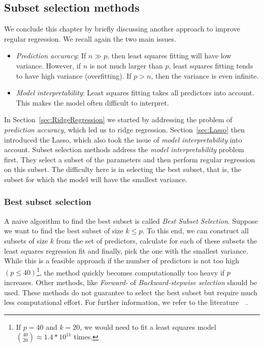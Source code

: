 \subsection{Subset selection methods}
We conclude this chapter by briefly discussing another approach to improve regular regression. We recall again the two main issues.
\begin{itemize}
    \item \textit{Prediction accuracy}: If $n \gg p$, then least squares fitting will have low variance. However, if $n$ is not much larger than $p$, least squares fitting tends to have high variance (overfitting). If $p > n$, then the variance is even infinite.
    \item \textit{Model interpretability}: Least squares fitting takes all predictors into account. This makes the model often difficult to interpret.
\end{itemize}
In Section~\ref{sec:RidgeRegression} we started by addressing the problem of \textit{prediction accuracy}, which led us to ridge regression. Section~\ref{sec:Lasso} then introduced the Lasso, which also took the issue of \textit{model interpretability} into account. Subset selection methods address the \textit{model interpretability} problem first. They select a subset of the parameters and then perform regular regression on this subset. The difficulty here is in selecting the best subset, that is, the subset for which the model will have the smallest variance.

\subsubsection{Best subset selection}
A naive algorithm to find the best subset is called \textit{Best Subset Selection}. Suppose we want to find the best subset of size $k \leqslant p$. To this end, we can construct all subsets of size $k$ from the set of predictors, calculate for each of these subsets the least squares regression fit and finally, pick the one with the smallest variance. While this is a feasible approach if the number of predictors is not too high $(p \leqslant 40)$\footnote{If $p = 40$ and $k = 20$, we would need to fit a least squares model $\binom{40}{20} \approx 1.4*10^{11}$ times.}, the method quickly becomes computationally too heavy if $p$ increases. Other methods, like \textit{Forward-} of \textit{Backward-stepwise selection} should be used. These methods do not guarantee to select the best subset but require much less computational effort. For further information, we refer to the literature~\cite{ESL2009}~\cite{ISL2013}.